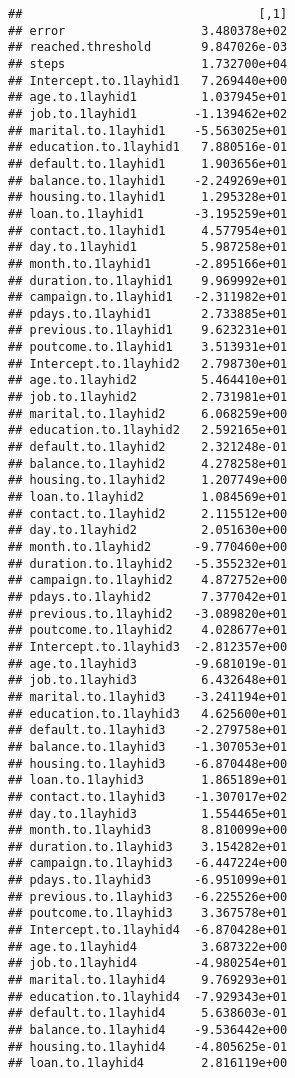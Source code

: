 \documentclass[
]{article}
\begin{document}
\begin{verbatim}
##                                 [,1]
## error                   3.480378e+02
## reached.threshold       9.847026e-03
## steps                   1.732700e+04
## Intercept.to.1layhid1   7.269440e+00
## age.to.1layhid1         1.037945e+01
## job.to.1layhid1        -1.139462e+02
## marital.to.1layhid1    -5.563025e+01
## education.to.1layhid1   7.880516e-01
## default.to.1layhid1     1.903656e+01
## balance.to.1layhid1    -2.249269e+01
## housing.to.1layhid1     1.295328e+01
## loan.to.1layhid1       -3.195259e+01
## contact.to.1layhid1     4.577954e+01
## day.to.1layhid1         5.987258e+01
## month.to.1layhid1      -2.895166e+01
## duration.to.1layhid1    9.969992e+01
## campaign.to.1layhid1   -2.311982e+01
## pdays.to.1layhid1       2.733885e+01
## previous.to.1layhid1    9.623231e+01
## poutcome.to.1layhid1    3.513931e+01
## Intercept.to.1layhid2   2.798730e+01
## age.to.1layhid2         5.464410e+01
## job.to.1layhid2         2.731981e+01
## marital.to.1layhid2     6.068259e+00
## education.to.1layhid2   2.592165e+01
## default.to.1layhid2     2.321248e-01
## balance.to.1layhid2     4.278258e+01
## housing.to.1layhid2     1.207749e+00
## loan.to.1layhid2        1.084569e+01
## contact.to.1layhid2     2.115512e+00
## day.to.1layhid2         2.051630e+00
## month.to.1layhid2      -9.770460e+00
## duration.to.1layhid2   -5.355232e+01
## campaign.to.1layhid2    4.872752e+00
## pdays.to.1layhid2       7.377042e+01
## previous.to.1layhid2   -3.089820e+01
## poutcome.to.1layhid2    4.028677e+01
## Intercept.to.1layhid3  -2.812357e+00
## age.to.1layhid3        -9.681019e-01
## job.to.1layhid3         6.432648e+01
## marital.to.1layhid3    -3.241194e+01
## education.to.1layhid3   4.625600e+01
## default.to.1layhid3    -2.279758e+01
## balance.to.1layhid3    -1.307053e+01
## housing.to.1layhid3    -6.870448e+00
## loan.to.1layhid3        1.865189e+01
## contact.to.1layhid3    -1.307017e+02
## day.to.1layhid3         1.554465e+01
## month.to.1layhid3       8.810099e+00
## duration.to.1layhid3    3.154282e+01
## campaign.to.1layhid3   -6.447224e+00
## pdays.to.1layhid3      -6.951099e+01
## previous.to.1layhid3   -6.225526e+00
## poutcome.to.1layhid3    3.367578e+01
## Intercept.to.1layhid4  -6.870428e+01
## age.to.1layhid4         3.687322e+00
## job.to.1layhid4        -4.980254e+01
## marital.to.1layhid4     9.769293e+01
## education.to.1layhid4  -7.929343e+01
## default.to.1layhid4     5.638603e-01
## balance.to.1layhid4    -9.536442e+00
## housing.to.1layhid4    -4.805625e-01
## loan.to.1layhid4        2.816119e+00

\end{verbatim}
\end{document}
